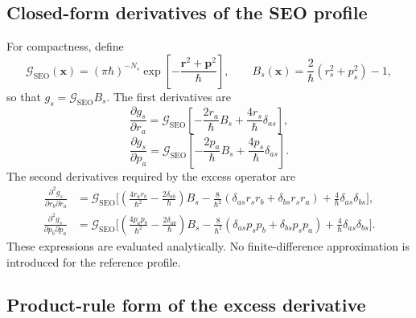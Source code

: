 \documentclass[
  11pt,
  letterpaper,
  onehalfspacing,
  normalmargins,
  equalmargins,
  oneside
]{ut-thesis}
\begin{document}
\subsection{Closed-form derivatives of the SEO profile}
\label{subsec:seo-profile-derivatives}

For compactness, define
\begin{equation}
\mathcal G_{\mathrm{SEO}}(\mathbf x)
=
(\pi\hbar)^{-N_s}
\exp\left[-\frac{\mathbf r^2+\mathbf p^2}{\hbar}\right],
\qquad
B_s(\mathbf x)
=
\frac{2}{\hbar}\left(r_s^2+p_s^2\right)-1,
\label{eq:seo-profile-factorization}
\end{equation}
so that \(g_s=\mathcal G_{\mathrm{SEO}} B_s\). The first derivatives are
\begin{equation}
\frac{\partial g_s}{\partial r_a}
=
\mathcal G_{\mathrm{SEO}}
\left[
-
\frac{2r_a}{\hbar}B_s
+
\frac{4r_s}{\hbar}\delta_{as}
\right],
\label{eq:seo-profile-first-r-derivative}
\end{equation}
\begin{equation}
\frac{\partial g_s}{\partial p_a}
=
\mathcal G_{\mathrm{SEO}}
\left[
-
\frac{2p_a}{\hbar}B_s
+
\frac{4p_s}{\hbar}\delta_{as}
\right].
\label{eq:seo-profile-first-p-derivative}
\end{equation}
The second derivatives required by the excess operator are
\begin{align}
\frac{\partial^2 g_s}{\partial r_b\partial r_a}
&=
\mathcal G_{\mathrm{SEO}}
\Bigg[
\left(
\frac{4r_ar_b}{\hbar^2}
-
\frac{2\delta_{ab}}{\hbar}
\right)B_s
-
\frac{8}{\hbar^2}
\left(
\delta_{as}r_sr_b
+
\delta_{bs}r_sr_a
\right)
+
\frac{4}{\hbar}
\delta_{as}\delta_{bs}
\Bigg],
\label{eq:seo-profile-second-r-derivative}
\end{align}
\begin{align}
\frac{\partial^2 g_s}{\partial p_b\partial p_a}
&=
\mathcal G_{\mathrm{SEO}}
\Bigg[
\left(
\frac{4p_ap_b}{\hbar^2}
-
\frac{2\delta_{ab}}{\hbar}
\right)B_s
-
\frac{8}{\hbar^2}
\left(
\delta_{as}p_sp_b
+
\delta_{bs}p_sp_a
\right)
+
\frac{4}{\hbar}
\delta_{as}\delta_{bs}
\Bigg].
\label{eq:seo-profile-second-p-derivative}
\end{align}
These expressions are evaluated analytically. No finite-difference
approximation is introduced for the reference profile.


\subsection{Product-rule form of the excess derivative}
\label{subsec:mixed-derivatives-mapping-qcle}
\end{document}
